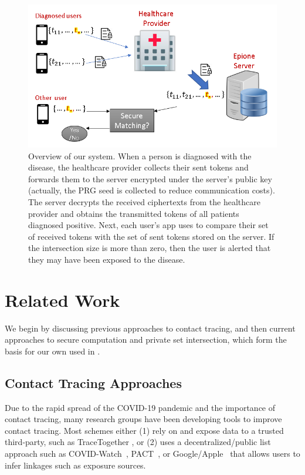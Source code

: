 \begin{figure}[t]
	\centering
	\includegraphics[scale=0.54,bb= 0 0 537 380]{figs/overview_system.PNG}
	\caption{Overview of our \dect system. When a person is diagnosed with the disease, the healthcare provider collects their sent tokens and forwards them to the \dect server encrypted under the server's public key (actually, the PRG seed is collected to reduce communication costs). The \dect server decrypts the received ciphertexts from the healthcare provider and obtains the transmitted tokens of all patients diagnosed positive. Next, each user's app uses \psica to compare their set of received tokens with the set of sent tokens stored on the \dect server. If the intersection size is more than zero, then the user is alerted that they may have been exposed to the disease.}	
	\label{fig:overview_system}
\end{figure}


\section{Related Work} 

We begin by discussing previous approaches to contact tracing, and then current approaches to secure computation and private set intersection, which form the basis for our own \psica used in \dect.

\subsection{Contact Tracing Approaches}
\label{subs:rel_work_ct}
Due to the rapid spread of the COVID-19 pandemic and the importance of contact tracing, many research groups have been developing tools to improve contact tracing. Most schemes either (1) rely on and expose data to a trusted third-party, such as TraceTogether \cite{ttg}, or (2) uses a decentralized/public list approach such as COVID-Watch~\cite{Covid-watch}, PACT~\cite{chan2020pact}, or Google/Apple~\cite{google-apple} that allows users to infer linkages such as exposure sources.

